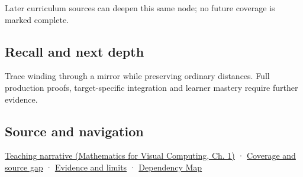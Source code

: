\hypertarget{appendix-87d7626c8d37-used-by}{}

Later curriculum sources can deepen this same node; no future coverage is marked complete.

\subsection{Recall and next depth}\label{appendix-87d7626c8d37-recall-and-next-depth}

\hypertarget{appendix-87d7626c8d37-recall-and-next-depth}{}

Trace winding through a mirror while preserving ordinary distances. Full production proofs, target-specific integration and learner mastery require further evidence.

\subsection{Source and navigation}\label{appendix-87d7626c8d37-source-and-navigation}

\hypertarget{appendix-87d7626c8d37-source-and-navigation}{}

\href{../02-Mathematics-for-Visual-Computing/main.pdf\#nameddest=01-foundations-i-ch017-oriented-area-tells-us-which-side-of-the-panel-is-front}{Teaching narrative (Mathematics for Visual Computing, Ch. 1)} · \hyperref[appendix-fd090d982a15-phase-6---parts-501-600]{Coverage and source gap} · \hyperref[appendix-a103e7846d21-phase-6---source-analysis-and-verification]{Evidence and limits} · \hyperref[appendix-4ad47bdd269a]{Dependency Map}

